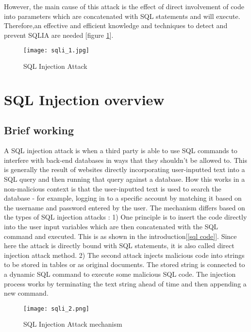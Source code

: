 \documentclass[12pt]{article}
\begin{document}
However, the main cause of this attack is the effect of direct involvement of code into parameters which are concatenated with SQL
statements and will execute. Therefore,an effective and efficient knowledge and techniques to detect and prevent SQLIA are needed [figure \ref{fig_1}].

\begin{figure}[h]
\centering
\texttt{[image: sqli\_1.jpg]}
\caption{SQL Injection Attack}
\label{fig_1}
\end{figure}
\newpage
\section{SQL Injection overview}
\subsection{Brief working}
A SQL injection attack is when a third party is able to use SQL commands to interfere with back-end databases in ways that they shouldn't be allowed to. This is generally the result of websites directly incorporating user-inputted text into a SQL query and then running that query against a database. How this works in a non-malicious context is that the user-inputted text is used to search the database - for example, logging in to a specific account by matching it based on the username and password entered by the user.
The mechanism differs based on the types of SQL injection attacks \cite{ma2019research}:
1) One principle is to insert the code directly into the user input variables which are then concatenated with the SQL command and executed. This is as shown in the introduction[\ref{sql code}]. Since here the attack is directly bound with SQL 
statements, it is also called direct injection attack method.
2) The second attack injects malicious code into strings to be stored in tables or as original documents. The stored string is connected to a dynamic SQL command to execute some malicious SQL 
code. 
The injection process works by terminating the text 
string ahead of time and then appending a new command. 

\begin{figure}[h]
\centering
\texttt{[image: sqli\_2.png]}
\caption{SQL Injection Attack mechanism}
\label{fig_2}
\end{figure}
\newpage
\end{document}
